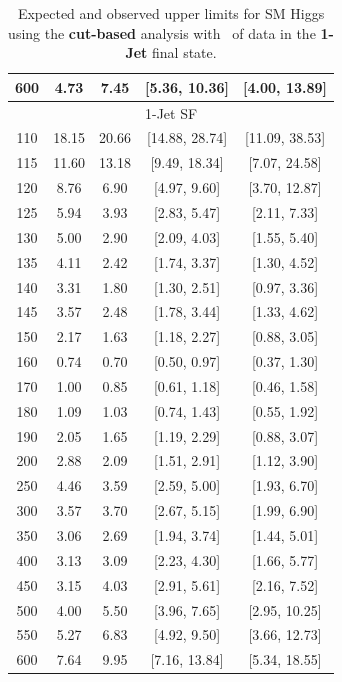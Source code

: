 \begin{table}[hbp!]
\begin{center}
\begin{tabular}{c c c c c}
600 & 4.73 & 7.45 & [5.36, 10.36] & [4.00, 13.89] \\
\hline
\multicolumn{5}{c}{1-Jet SF} \\
\hline
110 & 18.15 & 20.66 & [14.88, 28.74] & [11.09, 38.53] \\
115 & 11.60 & 13.18 & [9.49, 18.34] & [7.07, 24.58] \\
120 & 8.76 & 6.90 & [4.97, 9.60] & [3.70, 12.87] \\
125 & 5.94 & 3.93 & [2.83, 5.47] & [2.11, 7.33] \\
130 & 5.00 & 2.90 & [2.09, 4.03] & [1.55, 5.40] \\
135 & 4.11 & 2.42 & [1.74, 3.37] & [1.30, 4.52] \\
140 & 3.31 & 1.80 & [1.30, 2.51] & [0.97, 3.36] \\
145 & 3.57 & 2.48 & [1.78, 3.44] & [1.33, 4.62] \\
150 & 2.17 & 1.63 & [1.18, 2.27] & [0.88, 3.05] \\
160 & 0.74 & 0.70 & [0.50, 0.97] & [0.37, 1.30] \\
170 & 1.00 & 0.85 & [0.61, 1.18] & [0.46, 1.58] \\
180 & 1.09 & 1.03 & [0.74, 1.43] & [0.55, 1.92] \\
190 & 2.05 & 1.65 & [1.19, 2.29] & [0.88, 3.07] \\
200 & 2.88 & 2.09 & [1.51, 2.91] & [1.12, 3.90] \\
250 & 4.46 & 3.59 & [2.59, 5.00] & [1.93, 6.70] \\
300 & 3.57 & 3.70 & [2.67, 5.15] & [1.99, 6.90] \\
350 & 3.06 & 2.69 & [1.94, 3.74] & [1.44, 5.01] \\
400 & 3.13 & 3.09 & [2.23, 4.30] & [1.66, 5.77] \\
450 & 3.15 & 4.03 & [2.91, 5.61] & [2.16, 7.52] \\
500 & 4.00 & 5.50 & [3.96, 7.65] & [2.95, 10.25] \\
550 & 5.27 & 6.83 & [4.92, 9.50] & [3.66, 12.73] \\
600 & 7.64 & 9.95 & [7.16, 13.84] & [5.34, 18.55] \\
\hline
\end{tabular}
\caption{Expected and observed upper limits for SM Higgs using the
  {\bf cut-based} analysis with \intlumiEightTeV\ of data in the {\bf 1-Jet} final state.}
\label{tab:cutbase_uls_1j}
\end{center}
\end{table}

